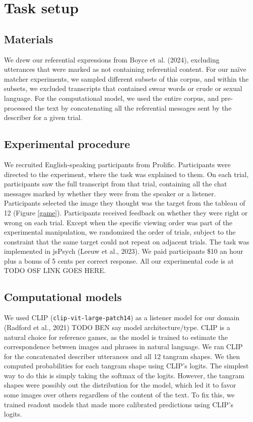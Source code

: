 \documentclass[10pt, letterpaper]{article}
\begin{document}
\section{Task setup}\label{task-setup}

\subsection{Materials}\label{materials}

We drew our referential expressions from Boyce et al. (2024), excluding
utterances that were marked as not containing referential content. For
our naïve matcher experiments, we sampled different subsets of this
corpus, and within the subsets, we excluded transcripts that contained
swear words or crude or sexual language. For the computational model, we
used the entire corpus, and pre-processed the text by concatenating all
the referential messages sent by the describer for a given trial.

\subsection{Experimental procedure}\label{experimental-procedure}

We recruited English-speaking participants from Prolific. Participants
were directed to the experiment, where the task was explained to them.
On each trial, participants saw the full transcript from that trial,
containing all the chat messages marked by whether they were from the
speaker or a listener. Participants selected the image they thought was
the target from the tableau of 12 (Figure \ref{game}). Participants
received feedback on whether they were right or wrong on each trial.
Except when the specific viewing order was part of the experimental
manipulation, we randomized the order of trials, subject to the
constraint that the same target could not repeat on adjacent trials. The
task was implemented in jsPsych (Leeuw et al., 2023). We paid
participants \$10 an hour plus a bonus of 5 cents per correct response.
All our experimental code is at TODO OSF LINK GOES HERE.

\subsection{Computational models}\label{computational-models}

We used CLIP (\texttt{clip-vit-large-patch14}) as a listener model for
our domain (Radford et al., 2021) TODO BEN say model architecture/type.
CLIP is a natural choice for reference games, as the model is trained to
estimate the correspondence between images and phrases in natural
language. We ran CLIP for the concatenated describer utterances and all
12 tangram shapes. We then computed probabilities for each tangram shape
using CLIP's logits. The simplest way to do this is simply taking the
softmax of the logits. However, the tangram shapes were possibly out the
distribution for the model, which led it to favor some images over
others regardless of the content of the text. To fix this, we trained
readout models that made more calibrated predictions using CLIP's
logits.
\end{document}

